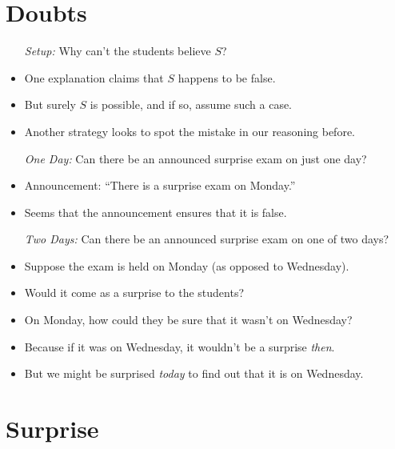 \documentclass[a4paper, 11pt]{article} %
\begin{document}
\section*{Doubts}

\begin{itemize}
  \item[\it Setup:] Why can't the students believe $S$?
    \item One explanation claims that $S$ happens to be false. 
    \item But surely $S$ is possible, and if so, assume such a case. 
    \item Another strategy looks to spot the mistake in our reasoning before.
  \item[\it One Day:] Can there be an announced surprise exam on just one day?
    \item Announcement: ``There is a surprise exam on Monday.''
    \item Seems that the announcement ensures that it is false.
  \item[\it Two Days:] Can there be an announced surprise exam on one of two days?
    \item Suppose the exam is held on Monday (as opposed to Wednesday).
    \item Would it come as a surprise to the students?
    \item On Monday, how could they be sure that it wasn't on Wednesday?
    \item Because if it was on Wednesday, it wouldn't be a surprise \textit{then}.
    \item But we might be surprised \textit{today} to find out that it is on Wednesday.
\end{itemize}




\section*{Surprise}
\end{document}
